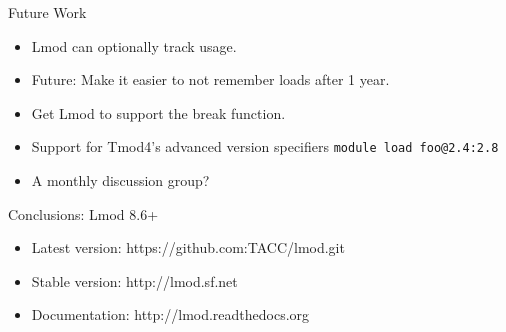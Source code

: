 \documentclass{beamer}
\begin{document}
\begin{frame}{Future Work}
  \begin{itemize}
    \item Lmod can optionally track usage.
    \item Future: Make it easier to not remember loads after 1 year.
    \item Get Lmod to support the break function.
    \item Support for Tmod4's advanced version specifiers
      \texttt{module load foo@2.4:2.8}
    \item A monthly discussion group?
  \end{itemize}
\end{frame}


\begin{frame}{Conclusions: Lmod 8.6+}
  \begin{itemize}
    \item Latest version: https://github.com:TACC/lmod.git
    \item Stable version: http://lmod.sf.net
    \item Documentation:  http://lmod.readthedocs.org
  \end{itemize}
\end{frame}
\end{document}
